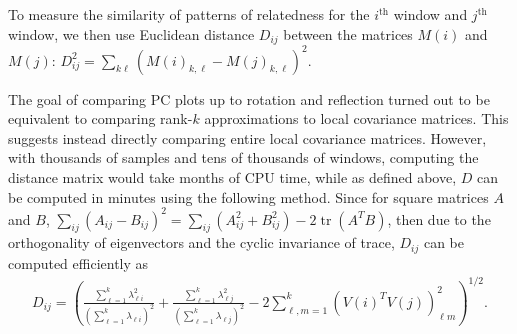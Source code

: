 \documentclass[11pt, oneside]{article}   	%
\DeclareMathOperator{\tr}{tr}
\begin{document}
To measure the similarity of patterns of relatedness for the $i^\text{th}$ window and $j^\text{th}$ window,
we then use
Euclidean distance $D_{ij}$ between the matrices $M(i)$ and $M(j)$:
$D_{ij}^2 = \sum_{k\ell} ( M(i)_{k,\ell} - M(j)_{k,\ell} )^2$.


The goal of comparing PC plots up to rotation and reflection 
turned out to be equivalent to comparing rank-$k$ approximations to local covariance matrices.
This suggests instead directly comparing entire local covariance matrices. 
However, with thousands of samples and tens of thousands of windows,
computing the distance matrix would take months of CPU time,
while as defined above, $D$ can be computed in minutes using the following method.
Since for square matrices $A$ and $B$,
$\sum_{ij} (A_{ij}-B_{ij})^2 = \sum_{ij} (A^2_{ij} + B^2_{ij}) - 2 \tr(A^T B)$,
then due to the orthogonality of eigenvectors and the cyclic invariance of trace,
$D_{ij}$ can be computed efficiently as
\begin{align}
    D_{ij} 
    = 
    \left(
    \frac{ \sum_{\ell=1}^k \lambda_{\ell i}^2 }{ (\sum_{\ell=1}^k \lambda_{\ell i})^2 }
    + \frac{ \sum_{\ell=1}^k \lambda_{\ell j}^2 }{ (\sum_{\ell=1}^k \lambda_{\ell j})^2 }
    - 2 \sum_{\ell, m=1}^k (V(i)^T V(j))^2_{\ell m} 
    \right)^{1/2}.
\end{align}
\end{document}
